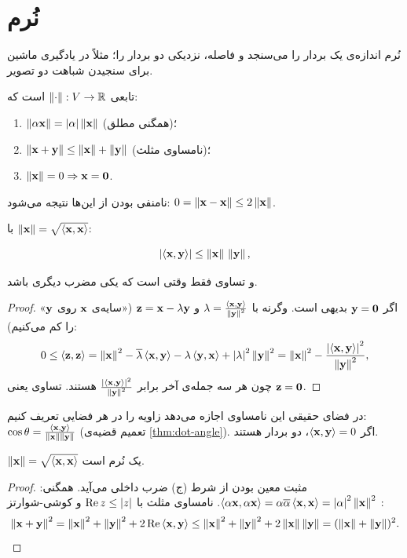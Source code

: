 \section{نُرم}

نُرم اندازه‌ی یک بردار را می‌سنجد و فاصله، نزدیکی دو بردار را؛ مثلاً در یادگیری ماشین برای سنجیدن شباهت دو تصویر.

\begin{definition}[نُرم]
 تابعی $\norm{\cdot}:V\to\R$ است که:
\begin{enumerate}
  \item $\norm{\alpha\vx}=\abs{\alpha}\norm{\vx}$ (همگنی مطلق)؛
  \item $\norm{\vx+\vy}\le\norm{\vx}+\norm{\vy}$ (نامساوی مثلث)؛
  \item $\norm{\vx}=0\Rightarrow\vx=\zero$.
\end{enumerate}
نامنفی بودن از این‌ها نتیجه می‌شود: $0=\norm{\vx-\vx}\le2\norm{\vx}$.
\end{definition}

\begin{theorem}\label{thm:cauchy-schwarz}
با $\norm{\vx}=\sqrt{\inner{\vx}{\vx}}$:
\begin{keyformula}
\[
\abs{\inner{\vx}{\vy}}\le\norm{\vx}\,\norm{\vy},
\]
\end{keyformula}
و تساوی فقط وقتی است که یکی مضرب دیگری باشد.
\end{theorem}
\begin{proof}
اگر $\vy=\zero$ بدیهی است. وگرنه با $\lambda=\frac{\inner{\vx}{\vy}}{\norm{\vy}^2}$ و $\vz=\vx-\lambda\vy$ («سایه‌ی $\vx$ روی $\vy$» را کم می‌کنیم):
\[
0\le\inner{\vz}{\vz}=\norm{\vx}^2-\conj{\lambda}\inner{\vx}{\vy}-\lambda\inner{\vy}{\vx}+\abs{\lambda}^2\norm{\vy}^2=\norm{\vx}^2-\frac{\abs{\inner{\vx}{\vy}}^2}{\norm{\vy}^2},
\]
چون هر سه جمله‌ی آخر برابر $\frac{\abs{\inner{\vx}{\vy}}^2}{\norm{\vy}^2}$ هستند. تساوی یعنی $\vz=\zero$.
\end{proof}

\begin{note}
در فضای حقیقی این نامساوی اجازه می‌دهد زاویه را در هر فضایی تعریف کنیم: $\cos\theta=\frac{\inner{\vx}{\vy}}{\norm{\vx}\norm{\vy}}$ (تعمیم قضیه‌ی \ref{thm:dot-angle}). اگر $\inner{\vx}{\vy}=0$، دو بردار  هستند.
\end{note}

\begin{theorem}\label{thm:inner-norm}
$\norm{\vx}=\sqrt{\inner{\vx}{\vx}}$ یک نُرم است.
\end{theorem}
\begin{proof}
مثبت معین بودن از شرط (ج) ضرب داخلی می‌آید. همگنی: $\inner{\alpha\vx}{\alpha\vx}=\alpha\conj{\alpha}\inner{\vx}{\vx}=\abs{\alpha}^2\norm{\vx}^2$. نامساوی مثلث با $\operatorname{Re}z\le\abs z$ و کوشی-شوارتز :
\[
\norm{\vx+\vy}^2=\norm{\vx}^2+\norm{\vy}^2+2\operatorname{Re}\inner{\vx}{\vy}\le\norm{\vx}^2+\norm{\vy}^2+2\norm{\vx}\norm{\vy}=(\norm{\vx}+\norm{\vy})^2.
\]
\end{proof}

